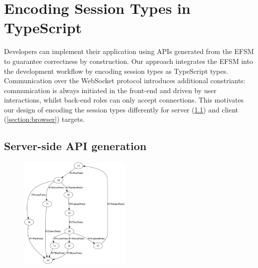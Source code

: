 \section{Encoding Session Types in TypeScript}

Developers can implement their application using APIs generated from the EFSM
to guarantee correctness by construction.
Our approach integrates the EFSM into the development workflow by encoding
session types as TypeScript types.
Communication over the WebSocket protocol introduces additional constriants: 
communication is always initiated in the front-end and driven by user interactions, 
whilst back-end roles can only accept connections.
This motivates our design of encoding the session types differently for server (\cref{section:server}) and client (\cref{section:browser}) targets.



\subsection{Server-side API generation}
\label{section:server}


\begin{figure}
  \vspace{-5mm}
  \begin{center}
    \includegraphics[width=0.48\textwidth]{figures/efsm_svr.png}
  \end{center}

  \vspace{-5mm}
  \label{fig:efsmsvr}
\vspace{-1cm}
\end{figure}

